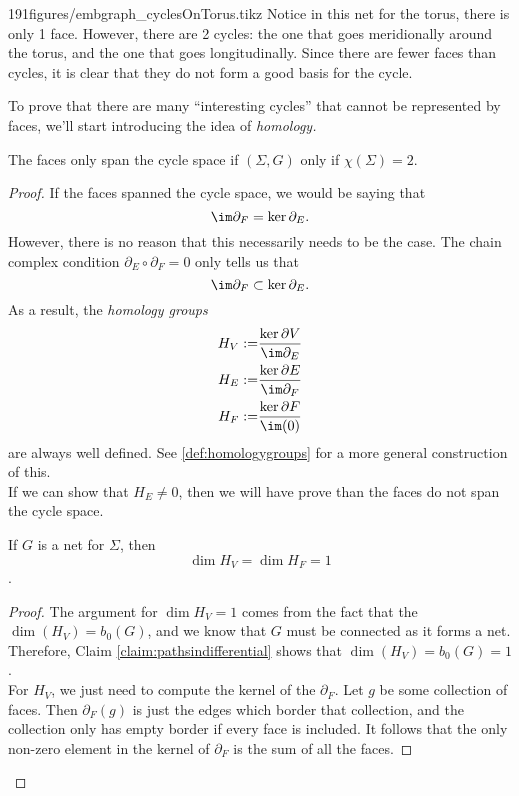 \begin{examplefigureenv}{191figures/embgraph_cyclesOnTorus.tikz}
	Notice in this net for the torus, there is only 1 face. However, there are 2 cycles: the one that goes meridionally around the torus, and the one that goes longitudinally. Since there are fewer faces than cycles, it is clear that they do not form a good basis for the cycle.
\end{examplefigureenv}
To prove that there are many ``interesting cycles'' that cannot be represented by faces, we'll start introducing the idea of \emph{homology.}
\begin{theorem}
The faces only span the cycle space if $(\Sigma, G)$ only if $\chi(\Sigma)=2.$
\end{theorem}
\begin{proof}
If the faces spanned the cycle space, we would be saying that 
\[\im \partial_F=\ker \partial_E .\]
However, there is no reason that this necessarily needs to be the case. The chain complex condition $\partial_E\circ \partial_F=0$ only tells us that 
\[\im \partial_F\subset\ker \partial_E .\]
As a result, the \emph{homology groups} 
\begin{align*}
H_V:=& \frac{\ker \partial V}{\im \partial_E}\\
H_E:=& \frac{\ker \partial E}{\im \partial_F}\\
H_F:=& \frac{\ker \partial F}{\im (0)}
\end{align*}
are always well defined. See \ref{def:homologygroups} for a more general construction of this. \\
If we can show that $H_E\neq 0$, then we will have prove than the faces do not span the cycle space. \\
\begin{lemma}
If $G$ is a net for $\Sigma$, then 
\[\dim H_V = \dim H_F =1 \].
\end{lemma}
\begin{proof}
The argument for $\dim H_V=1$ comes from the fact that the $\dim(H_V)=b_0(G)$, and we know that $G$ must be connected as it forms a net. Therefore, Claim \ref{claim:pathsindifferential} shows that $\dim(H_V)=b_0(G)=1$. \\
For $H_V$, we just need to compute the kernel of the $\partial_F$. Let $g$ be some collection of faces. Then $\partial_F(g)$ is just the edges which border that collection, and the collection only has empty border if every face is included. It follows that the only non-zero element in the kernel of $\partial_F$ is the sum of all the faces. 

\end{proof}
\end{proof}
